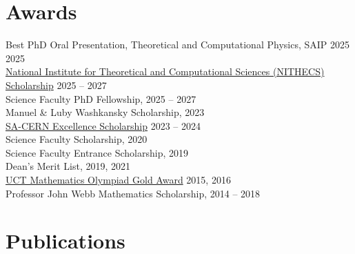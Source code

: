 \documentclass[11pt,letter,sans]{moderncv}
\begin{document}
\section{Awards}
 Best PhD Oral Presentation, Theoretical and Computational Physics, SAIP 2025  \hfill 2025    \\[0.5mm]
    \href{https://nithecs.ac.za/}{National Institute for Theoretical and Computational Sciences (NITHECS) Scholarship}  \hfill 2025 -- 2027    \\[0.5mm]
 Science Faculty PhD Fellowship, {\scriptsize \color{gray}{University of Cape Town}}  \hfill 2025 -- 2027    \\[0.5mm]
 Manuel \& Luby Washkansky Scholarship, {\scriptsize \color{gray}{University of Cape Town}}  \hfill 2023    \\[0.5mm]
    \href{https://tlabs.ac.za/sa-cern/}{SA-CERN Excellence Scholarship}  \hfill 2023 -- 2024    \\[0.5mm]
 Science Faculty Scholarship, {\scriptsize \color{gray}{University of Cape Town}}  \hfill 2020    \\[0.5mm]
 Science Faculty Entrance Scholarship, {\scriptsize \color{gray}{University of Cape Town}}  \hfill 2019    \\[0.5mm]
 Dean’s Merit List, {\scriptsize \color{gray}{University of Cape Town (not awarded in 2020 due to COVID-19)}}  \hfill 2019, 2021    \\[0.5mm]
    \href{https://www.uctmathscompetition.org.za/home}{UCT Mathematics Olympiad Gold Award}  \hfill 2015, 2016    \\[0.5mm]
 Professor John Webb Mathematics Scholarship, {\scriptsize \color{gray}{Wynberg Boys' High School}}  \hfill 2014 -- 2018    \\[0.5mm]


\section{Publications}

\end{document}
